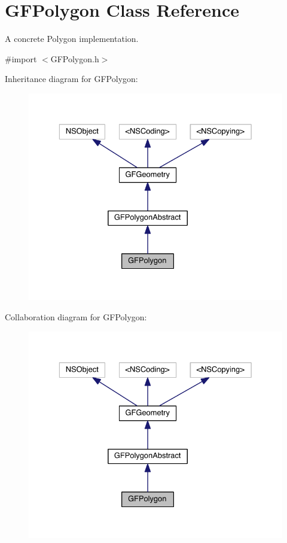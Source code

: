 \hypertarget{interface_g_f_polygon}{}\section{G\+F\+Polygon Class Reference}
\label{interface_g_f_polygon}


A concrete Polygon implementation.  




{\ttfamily \#import $<$G\+F\+Polygon.\+h$>$}



Inheritance diagram for G\+F\+Polygon\+:\nopagebreak
\begin{figure}[H]
\begin{center}
\leavevmode
\includegraphics[width=329pt]{interface_g_f_polygon__inherit__graph}
\end{center}
\end{figure}


Collaboration diagram for G\+F\+Polygon\+:\nopagebreak
\begin{figure}[H]
\begin{center}
\leavevmode
\includegraphics[width=329pt]{interface_g_f_polygon__coll__graph}
\end{center}
\end{figure}

